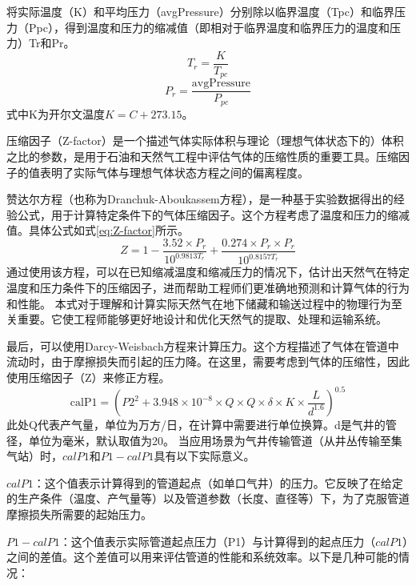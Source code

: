 将实际温度（K）和平均压力（avgPressure）分别除以临界温度（Tpc）和临界压力（Ppc），得到温度和压力的缩减值（即相对于临界温度和临界压力的温度和压力）Tr和Pr。
\begin{equation}
    T_r = \frac{K}{T_{pc}}
\end{equation}
\begin{equation}
    P_r = \frac{\text{avgPressure}}{P_{pc}}
\end{equation}
式中K为开尔文温度$K = C + 273.15$。

压缩因子（Z-factor）是一个描述气体实际体积与理论（理想气体状态下的）体积之比的参数，是用于石油和天然气工程中评估气体的压缩性质的重要工具。压缩因子的值表明了实际气体与理想气体状态方程之间的偏离程度。

赞达尔方程\cite{Dranchuk1975CalculationOZ}（也称为Dranchuk-Aboukassem方程），是一种基于实验数据得出的经验公式，用于计算特定条件下的气体压缩因子。这个方程考虑了温度和压力的缩减值。具体公式如式\eqref{eq:Z-factor}所示。
\begin{equation}
    Z = 1 - \frac{3.52 \times P_r}{10^{0.9813T_r}} + \frac{0.274 \times P_r \times P_r}{10^{0.8157T_r}}
    \label{eq:Z-factor}
\end{equation}
通过使用该方程，可以在已知缩减温度和缩减压力的情况下，估计出天然气在特定温度和压力条件下的压缩因子，进而帮助工程师们更准确地预测和计算气体的行为和性能。
本式对于理解和计算实际天然气在地下储藏和输送过程中的物理行为至关重要。它使工程师能够更好地设计和优化天然气的提取、处理和运输系统。

最后，可以使用Darcy-Weisbach方程\cite{brown2002history}来计算压力。这个方程描述了气体在管道中流动时，由于摩擦损失而引起的压力降。在这里，需要考虑到气体的压缩性，因此使用压缩因子（Z）来修正方程。
\begin{equation}
    \text{calP1} = \left(P2^2 + 3.948 \times 10^{-8} \times Q \times Q \times \delta \times K \times \frac{L}{d^{1.6}}\right)^{0.5}
\end{equation}
此处Q代表产气量，单位为万方/日，在计算中需要进行单位换算。d是气井的管径，单位为毫米，默认取值为20。
当应用场景为气井传输管道（从井丛传输至集气站）时，$calP1$和$P1 - calP1$具有以下实际意义。

$calP1$：这个值表示计算得到的管道起点（如单口气井）的压力。它反映了在给定的生产条件（温度、产气量等）以及管道参数（长度、直径等）下，为了克服管道摩擦损失所需要的起始压力。 

$P1 - calP1$：这个值表示实际管道起点压力（P1）与计算得到的起点压力（$calP1$）之间的差值。这个差值可以用来评估管道的性能和系统效率。以下是几种可能的情况：


